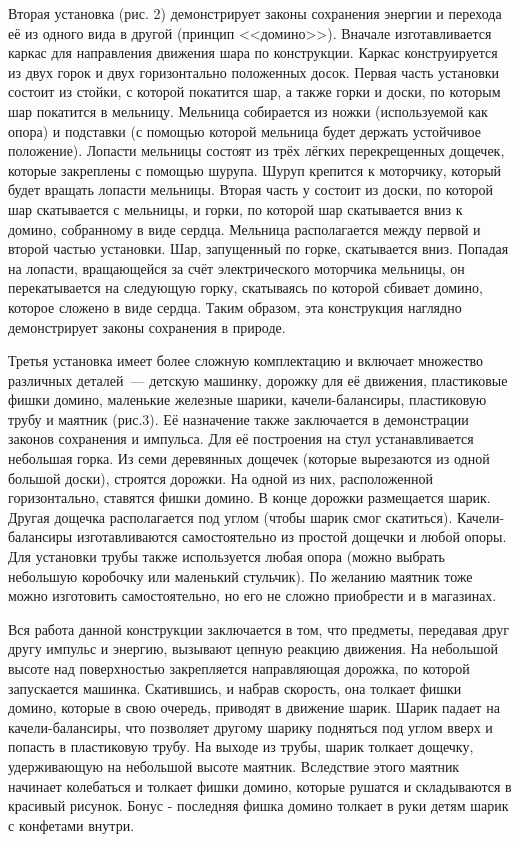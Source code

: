 Вторая установка (рис. 2) демонстрирует законы сохранения энергии и перехода её из одного вида в другой (принцип <<домино>>). Вначале изготавливается каркас для направления движения шара по конструкции. Каркас конструируется из двух горок и двух горизонтально положенных досок. Первая часть установки состоит из стойки, с которой покатится шар, а также горки и доски, по которым шар покатится в мельницу. Мельница собирается из ножки (используемой как опора) и подставки (с помощью которой мельница будет держать устойчивое положение). Лопасти мельницы состоят из трёх лёгких перекрещенных дощечек, которые закреплены с помощью шурупа. Шуруп крепится к моторчику, который будет вращать лопасти мельницы. Вторая часть у состоит из доски, по которой шар скатывается с мельницы, и горки, по которой шар скатывается вниз к домино, собранному в виде сердца. Мельница располагается между первой и второй частью установки.
\clearpage
Шар, запущенный по горке, скатывается вниз. Попадая на лопасти, вращающейся за счёт электрического моторчика мельницы, он перекатывается на следующую горку, скатываясь по которой сбивает домино, которое сложено в виде сердца. Таким образом, эта конструкция наглядно демонстрирует законы сохранения в природе.




Третья установка имеет более сложную комплектацию и включает множество различных деталей~--- детскую машинку, дорожку для её движения, пластиковые фишки домино, маленькие железные шарики, качели-балансиры, пластиковую трубу и маятник (рис.3). Её назначение также заключается в демонстрации законов сохранения и импульса. Для её построения на стул устанавливается небольшая горка. Из семи деревянных дощечек (которые вырезаются из одной большой доски), строятся дорожки. На одной из них, расположенной горизонтально, ставятся фишки домино. В конце дорожки размещается шарик. Другая дощечка располагается под углом (чтобы шарик смог скатиться). Качели-балансиры изготавливаются самостоятельно из простой дощечки и любой опоры. Для установки трубы также используется любая опора (можно выбрать небольшую коробочку или маленький стульчик). По желанию маятник тоже можно изготовить самостоятельно, но его не сложно приобрести и в магазинах.



Вся работа данной конструкции заключается в том, что предметы, передавая друг другу импульс и энергию, вызывают цепную реакцию движения. На небольшой высоте над поверхностью закрепляется направляющая дорожка, по которой запускается машинка. Скатившись, и набрав скорость, она толкает фишки домино, которые в свою очередь, приводят в движение шарик.  Шарик падает на качели-балансиры, что позволяет другому шарику подняться под углом вверх и попасть в пластиковую трубу. На выходе из трубы, шарик толкает дощечку, удерживающую на небольшой высоте маятник. Вследствие этого маятник начинает колебаться и толкает фишки домино, которые рушатся и складываются в красивый рисунок. Бонус - последняя фишка домино толкает в руки детям шарик с конфетами внутри.


